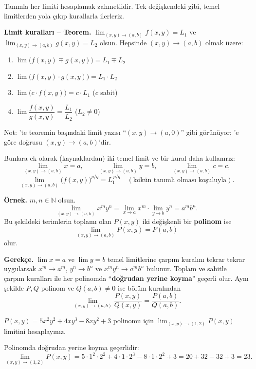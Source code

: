 Tanımla her limiti hesaplamak zahmetlidir. Tek değişkendeki gibi, temel limitlerden yola çıkıp kurallarla ilerleriz.

\begin{tahta}
\textbf{Limit kuralları -- Teorem.} $\displaystyle\lim_{(x,y)\to(a,b)}f(x,y)=L_1$ ve
$\displaystyle\lim_{(x,y)\to(a,b)}g(x,y)=L_2$ olsun. Hepsinde $(x,y)\to(a,b)$ olmak üzere:
\begin{enumerate}
  \item $\lim\big(f(x,y)\mp g(x,y)\big)=L_1\mp L_2$
  \item $\lim\big(f(x,y)\cdot g(x,y)\big)=L_1\cdot L_2$
  \item $\lim\big(c\cdot f(x,y)\big)=c\cdot L_1$ \quad ($c$ sabit)
  \item $\lim\dfrac{f(x,y)}{g(x,y)}=\dfrac{L_1}{L_2}$ \quad ($L_2\neq 0$)
\end{enumerate}
\end{tahta}

{\small\color{gri} Not: 'te teoremin başındaki limit yazısı ``$(x,y)\to(a,0)$'' gibi
görünüyor; 'e göre doğrusu $(x,y)\to(a,b)$'dir.}

Bunlara ek olarak (kaynaklardan) iki temel limit ve bir kural daha kullanırız:
\[
\lim_{(x,y)\to(a,b)}x=a,\qquad \lim_{(x,y)\to(a,b)}y=b,\qquad \lim_{(x,y)\to(a,b)}c=c,
\]
\[
\lim_{(x,y)\to(a,b)}\big(f(x,y)\big)^{p/q}=L_1^{\,p/q}\quad(\text{kökün tanımlı olması koşuluyla}).
\]

\begin{tahta}
\textbf{Örnek.} $m,n\in\mathbb N$ olsun.
\[
\lim_{(x,y)\to(a,b)}x^m y^n=\lim_{x\to a}x^m\cdot\lim_{y\to b}y^n=a^m b^n .
\]
Bu şekildeki terimlerin toplamı olan $P(x,y)$ iki değişkenli bir \textbf{polinom} ise
\[
\lim_{(x,y)\to(a,b)}P(x,y)=P(a,b)
\]
olur.
\end{tahta}

\textbf{Gerekçe.} $\lim x=a$ ve $\lim y=b$ temel limitlerine çarpım kuralını tekrar tekrar uygularsak $x^m\to a^m$,
$y^n\to b^n$ ve $x^my^n\to a^mb^n$ bulunur. Toplam ve sabitle çarpım kuralları ile her polinomda ``\textbf{doğrudan
yerine koyma}'' geçerli olur. Aynı şekilde $P,Q$ polinom ve $Q(a,b)\neq0$ ise bölüm kuralından
\[
\lim_{(x,y)\to(a,b)}\frac{P(x,y)}{Q(x,y)}=\frac{P(a,b)}{Q(a,b)} .
\]

\begin{soru}
$P(x,y)=5x^2y^2+4xy^3-8xy^2+3$ polinomu için $\displaystyle\lim_{(x,y)\to(1,2)}P(x,y)$ limitini hesaplayınız.
\end{soru}
\begin{cevap}
Polinomda doğrudan yerine koyma geçerlidir:
\[
\lim_{(x,y)\to(1,2)}P(x,y)=5\cdot1^2\cdot2^2+4\cdot1\cdot2^3-8\cdot1\cdot2^2+3=20+32-32+3=\boxed{23}.
\]
\end{cevap}

